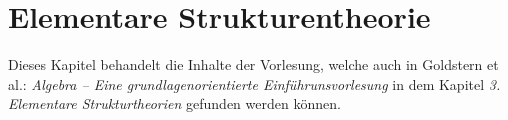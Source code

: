 \chapter{Elementare Strukturentheorie}

Dieses Kapitel behandelt die Inhalte der Vorlesung, welche auch in Goldstern et al.: \textit{Algebra -- Eine grundlagenorientierte Einführunsvorlesung} in dem Kapitel \textit{3. Elementare Strukturtheorien} gefunden werden können.


